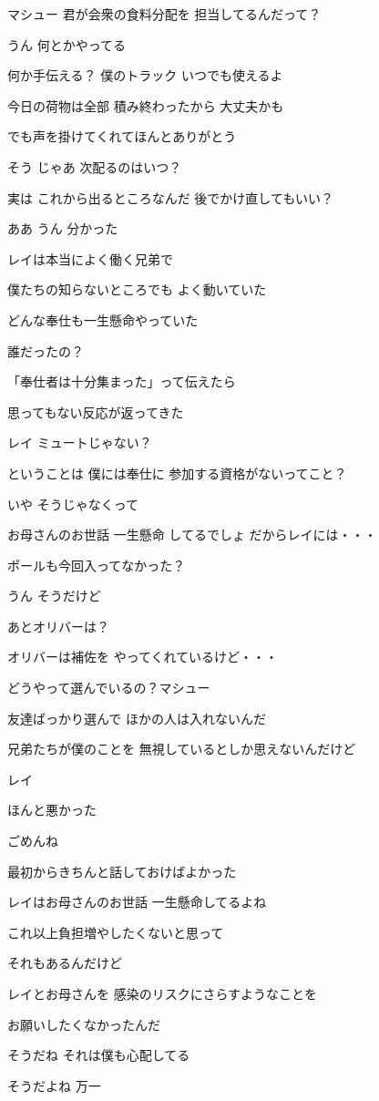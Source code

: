 \documentclass[twocolumn]{jsarticle}
\begin{document}
マシュー 君が会衆の食料分配を
担当してるんだって？

うん 何とかやってる

何か手伝える？
僕のトラック いつでも使えるよ

今日の荷物は全部
積み終わったから 大丈夫かも

でも声を掛けてくれてほんとありがとう

そう じゃあ 次配るのはいつ？

実は これから出るところなんだ
後でかけ直してもいい？

ああ うん 分かった

レイは本当によく働く兄弟で

僕たちの知らないところでも
よく動いていた

どんな奉仕も一生懸命やっていた

誰だったの？

「奉仕者は十分集まった」って伝えたら

思ってもない反応が返ってきた

レイ ミュートじゃない？

ということは 僕には奉仕に
参加する資格がないってこと？

いや そうじゃなくって

お母さんのお世話 一生懸命
してるでしょ だからレイには・・・

ポールも今回入ってなかった？

うん そうだけど

あとオリバーは？

オリバーは補佐を
やってくれているけど・・・

どうやって選んでいるの？マシュー

友達ばっかり選んで
ほかの人は入れないんだ

兄弟たちが僕のことを
無視しているとしか思えないんだけど

レイ

ほんと悪かった

ごめんね

最初からきちんと話しておけばよかった

レイはお母さんのお世話
一生懸命してるよね

これ以上負担増やしたくないと思って

それもあるんだけど

レイとお母さんを
感染のリスクにさらすようなことを

お願いしたくなかったんだ

そうだね それは僕も心配してる

そうだよね 万一
\end{document}
